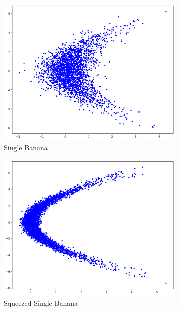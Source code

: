 \begin{figure}[ht]
\centering
\begin{subfigure}[b]{0.32\textwidth}
\includegraphics[width=\textwidth]{chapter5/results/visualisations/datasets/single_banana.png}
\caption{Single Banana}
\end{subfigure}
\begin{subfigure}[b]{0.32\textwidth}
\includegraphics[width=\textwidth]{chapter5/results/visualisations/datasets/squeezed_single_banana.png}
\caption{Squeezed Single Banana}
\end{subfigure}
\begin{subfigure}[b]{0.32\textwidth}

\end{subfigure}
\end{figure}
